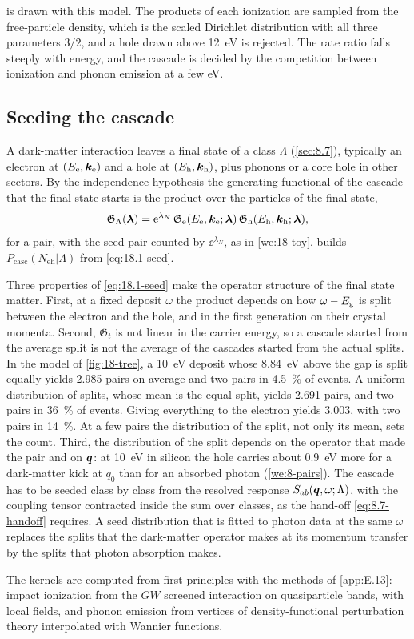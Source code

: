  is drawn with this model. The products of each ionization are sampled from the free-particle density, which is the scaled Dirichlet distribution with all three parameters $3/2$, and a hole drawn above \SI{12}{eV} is rejected. The rate ratio falls steeply with energy, and the cascade is decided by the competition between ionization and phonon emission at a few eV.

\subsection{Seeding the cascade}\label{sec:18.1-seed}

A dark-matter interaction leaves a final state of a class $\Lambda$ (\cref{sec:8.7}), typically an electron at $(E_{\mathrm{e}},\bm{k}_{\mathrm{e}})$ and a hole at $(E_{\mathrm{h}},\bm{k}_{\mathrm{h}})$, plus phonons or a core hole in other sectors. By the independence hypothesis the generating functional of the cascade that the final state starts is the product over the particles of the final state,
\begin{equation}
  \mathfrak{G}_\Lambda(\bm{\lambda}) = \mathrm{e}^{\lambda_N}\,\mathfrak{G}_{\mathrm{e}}(E_{\mathrm{e}},\bm{k}_{\mathrm{e}};\bm{\lambda})\,\mathfrak{G}_{\mathrm{h}}(E_{\mathrm{h}},\bm{k}_{\mathrm{h}};\bm{\lambda}) ,
  \label{eq:18.1-seed}
\end{equation}
for a pair, with the seed pair counted by $\ee^{\lambda_N}$, as in \cref{we:18-toy}.  builds $P_{\mathrm{casc}}(N_{\mathrm{eh}}|\Lambda)$ from \cref{eq:18.1-seed}.

Three properties of \cref{eq:18.1-seed} make the operator structure of the final state matter. First, at a fixed deposit $\omega$ the product depends on how $\omega - E_{\mathrm{g}}$ is split between the electron and the hole, and in the first generation on their crystal momenta. Second, $\mathfrak{G}_t$ is not linear in the carrier energy, so a cascade started from the average split is not the average of the cascades started from the actual splits. In the model of \cref{fig:18-tree}, a \SI{10}{eV} deposit whose \SI{8.84}{eV} above the gap is split equally yields 2.985 pairs on average and two pairs in \SI{4.5}{\percent} of events. A uniform distribution of splits, whose mean is the equal split, yields 2.691 pairs, and two pairs in \SI{36}{\percent} of events. Giving everything to the electron yields 3.003, with two pairs in \SI{14}{\percent}. At a few pairs the distribution of the split, not only its mean, sets the count. Third, the distribution of the split depends on the operator that made the pair and on $\bm{q}$: at \SI{10}{eV} in silicon the hole carries about \SI{0.9}{eV} more for a dark-matter kick at $q_0$ than for an absorbed photon (\cref{we:8-pairs}). The cascade has to be seeded class by class from the resolved response $S_{ab}(\bm{q},\omega;\Lambda)$, with the coupling tensor contracted inside the sum over classes, as the hand-off \cref{eq:8.7-handoff} requires. A seed distribution that is fitted to photon data at the same $\omega$ replaces the splits that the dark-matter operator makes at its momentum transfer by the splits that photon absorption makes.

The kernels are computed from first principles with the methods of \cref{app:E.13}: impact ionization from the $GW$ screened interaction on quasiparticle bands, with local fields, and phonon emission from vertices of density-functional perturbation theory interpolated with Wannier functions.
